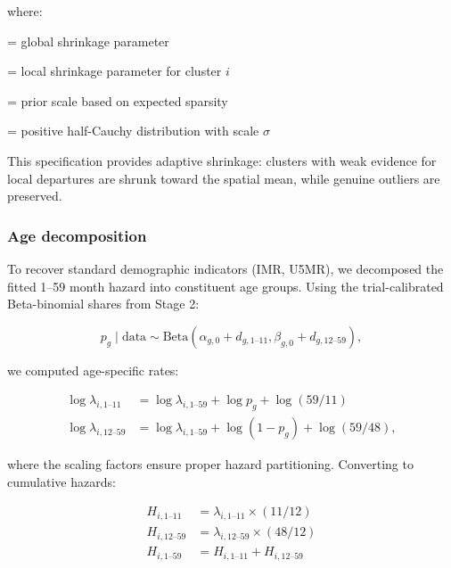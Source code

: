 \documentclass[11pt]{article}\usepackage[]{graphicx}\usepackage[]{xcolor}
\begin{document}
\noindent where:
\begin{description}[leftmargin=2em]
\item[$\tau$] = global shrinkage parameter
\item[$\tilde{\lambda}_i$] = local shrinkage parameter for cluster $i$
\item[$\tau_0$] = prior scale based on expected sparsity
\item[$\text{CauchyPos}(0, \sigma)$] = positive half-Cauchy distribution with scale $\sigma$
\end{description}

This specification provides adaptive shrinkage: clusters with weak evidence for local departures are shrunk toward the spatial mean, while genuine outliers are preserved.

\subsubsection{Age decomposition}

To recover standard demographic indicators (IMR, U5MR), we decomposed the fitted 1--59 month hazard into constituent age groups. Using the trial-calibrated Beta-binomial shares from Stage 2:

\begin{equation}
p_g \mid \text{data} \sim \text{Beta}(\alpha_{g,0} + d_{g,1\text{--}11}, \beta_{g,0} + d_{g,12\text{--}59}),
\end{equation}

\noindent we computed age-specific rates:

\begin{align}
\log \lambda_{i,1\text{--}11} &= \log \lambda_{i,1\text{--}59} + \log p_g + \log(59/11) \\
\log \lambda_{i,12\text{--}59} &= \log \lambda_{i,1\text{--}59} + \log(1-p_g) + \log(59/48),
\end{align}

\noindent where the scaling factors ensure proper hazard partitioning. Converting to cumulative hazards:

\begin{align}
H_{i,1\text{--}11} &= \lambda_{i,1\text{--}11} \times (11/12) \\
H_{i,12\text{--}59} &= \lambda_{i,12\text{--}59} \times (48/12) \\
H_{i,1\text{--}59} &= H_{i,1\text{--}11} + H_{i,12\text{--}59}
\end{align}
\end{document}
